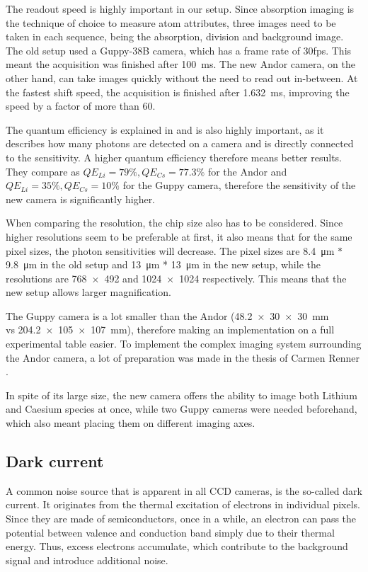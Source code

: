 The readout speed is highly important in our setup. Since absorption imaging is the technique of choice to measure atom attributes, three images need to be taken in each sequence, being the absorption, division and background image.
The old setup used a Guppy-38B \cite{Repp2013} camera, which has a frame rate of 30fps. This meant the acquisition was finished after \SI{100}{\milli\second}. The new Andor camera, on the other hand, can take images quickly without the need to read out in-between. At the fastest shift speed, the acquisition is finished after \SI{1.632}{\milli\second}, improving the speed by a factor of more than $60$.

The quantum efficiency is explained in  and is also highly important, as it describes how many photons are detected on a camera and is directly connected to the sensitivity. A higher quantum efficiency therefore means better results. They compare as $QE_{Li} = 79\%, QE_{Cs} = 77.3\%$ for the Andor and $QE_{Li} = 35\%, QE_{Cs} = 10\%$ for the Guppy camera, therefore the sensitivity of the new camera is significantly higher.

When comparing the resolution, the chip size also has to be considered. Since higher resolutions seem to be preferable at first, it also means that for the same pixel sizes, the photon sensitivities will decrease. The pixel sizes are \SI{8.4}{\micro\meter} $*$ \SI{9.8}{\micro\meter} in the old setup and \SI{13}{\micro\meter} * \SI{13}{\micro\meter} in the new setup, while the resolutions are \SI{768x492}{} and \SI{1024x1024}{} respectively. This means that the new setup allows larger magnification.

The Guppy camera is a lot smaller than the Andor (\SI{48.2x30x30}{\milli\meter} \\vs \SI{204.2x105x107}{\milli\meter}), therefore making an implementation on a full experimental table easier. To implement the complex imaging system surrounding the Andor camera, a lot of preparation was made in the thesis of Carmen Renner \cite{Renner2014}.

In spite of its large size, the new camera offers the ability to image both Lithium and Caesium species at once, while two Guppy cameras were needed beforehand, which also meant placing them on different imaging axes.

\subsection{Dark current}
A common noise source that is apparent in all CCD cameras, is the so-called dark current. It originates from the thermal excitation of electrons in individual pixels. Since they are made of semiconductors, once in a while, an electron can pass the potential between valence and conduction band simply due to their thermal energy. Thus, excess electrons accumulate, which contribute to the background signal and introduce additional noise\cite{FP362011}.

